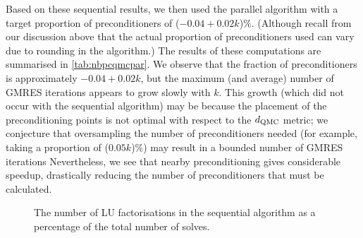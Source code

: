     Based on these sequential results, we then used the parallel algorithm with a target proportion of preconditioners of ($-0.04 + 0.02k$)\%. (Although recall from our discussion above that the actual proportion of preconditioners used can vary due to rounding in the algorithm.) The results of these computations are summarised in \cref{tab:nbpcqmcpar}. We observe that the fraction of preconditioners is approximately $-0.04 + 0.02k$, but the maximum (and average) number of GMRES iterations appears to grow slowly with $k.$ This growth (which did not occur with the sequential algorithm) may be because the placement of the preconditioning points is not optimal with respect to the $d_{\mathrm{QMC}}$ metric; we conjecture that oversampling the number of preconditioners needed (for example, taking a proportion of ($0.05k$)\%) may result in a bounded number of GMRES iterations Nevertheless, we see that nearby preconditioning gives considerable speedup, drastically reducing the number of preconditioners that must be calculated.

    \begin{figure}
      
      \caption[The number of LU factorisations in the sequential nearby-preconditioning-QMC algorithm as a percentage of the total number of solves.]{The number of LU factorisations in the sequential algorithm as a percentage of the total number of solves.\label{fig:lu}}
      \end{figure}

